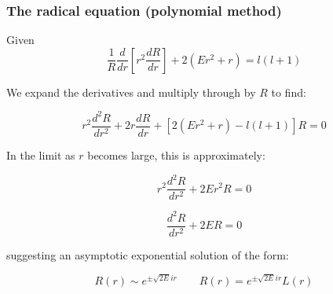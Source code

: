 \documentclass{beamer}
\begin{document}

\begin{frame}
\frametitle{The radical equation (polynomial method)}
Given
\[ \frac{1}{R} \frac{d}{dr}\left[ r^2 \frac{dR}{dr}\right] + 2(Er^2 + r) = l(l+1) \]

We expand the derivatives and multiply through by $R$ to find:

\[ r^2 \frac{d^2R}{dr^2} + 2r \frac{dR}{dr} + \left[2(E r^2+r) - l(l+1)\right] R = 0 \]

In the limit as $r$ becomes large, this is approximately:

\[ r^2 \frac{d^2R}{dr^2} + 2E r^2 R = 0 \]

\[ \frac{d^2R}{dr^2} + 2E R = 0 \]

suggesting an asymptotic exponential solution of the form:

\[ R(r) \sim e^{\pm \sqrt{2E}ir} \qquad R(r) = e^{\pm \sqrt{2E}ir} L(r) \]

\end{frame}
\end{document}
